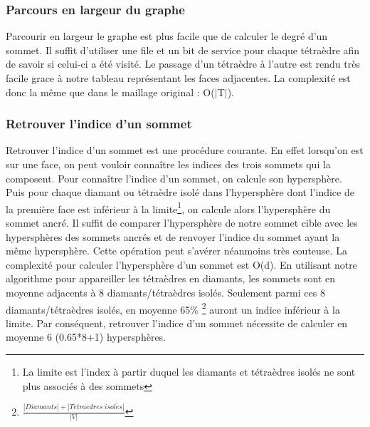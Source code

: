 \subsubsection{Parcours en largeur du graphe}
\noindent
Parcourir en largeur le graphe est plus facile que de calculer le degré d'un sommet. Il suffit d'utiliser une file et un bit de service pour chaque tétraèdre afin de savoir si celui-ci a été visité. Le passage d'un tétraèdre à l'autre est rendu très facile grace à notre tableau représentant les faces adjacentes. La complexité est donc la même que dans le maillage original : O($|$T$|$).
\subsubsection{Retrouver l'indice d'un sommet}
\label{Retrouver l'indice d'un sommet}
\noindent
Retrouver l'indice d'un sommet est une procédure courante. En effet lorsqu'on est sur une face, on peut vouloir connaître les indices des trois sommets qui la composent. Pour connaître l'indice d'un sommet, on calcule son hypersphère. Puis pour chaque diamant ou tétraèdre isolé dans l'hypersphère dont l'indice de la première face est inférieur à la limite\footnote{La limite est l'index à partir duquel les diamants et tétraèdres isolés ne sont plus associés à des sommets}, on calcule alors l'hypersphère du sommet ancré. Il suffit de comparer l'hypersphère de notre sommet cible avec les hypersphères des sommets ancrés et de renvoyer l'indice du sommet ayant la même hypersphère. Cette opération peut s'avérer néanmoins très couteuse. La complexité pour calculer l'hypersphère d'un sommet est O(d). En utilisant notre algorithme pour appareiller les tétraèdres en diamants, les sommets sont en moyenne adjacents à 8 diamants/tétraèdres isolés. Seulement parmi ces 8 diamants/tétraèdres isolés, en moyenne 65\% \footnote{$\frac{|Diamants|+|T\acute{e}tra\grave{e}dres\; isol\acute{e}s|}{|V|}$} auront un indice inférieur à la limite. Par conséquent, retrouver l'indice d'un sommet nécessite de calculer en moyenne 6 (0.65*8+1) hypersphères.

% 
% 


